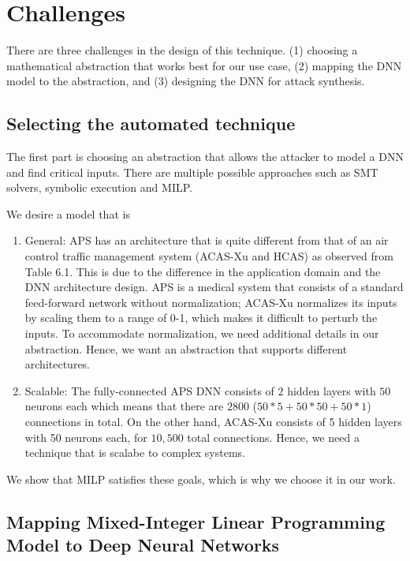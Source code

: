 \section{Challenges}
There are three challenges in the design of this technique. 
(1) choosing a mathematical abstraction that works best for our use case, 
(2) mapping the \ac{DNN}  model to the abstraction, and 
(3) designing the \ac{DNN}  for attack synthesis.  


\subsection{Selecting  the automated technique}
The first part is choosing an abstraction that allows the attacker to model a DNN and find critical inputs. 
There are multiple possible approaches such as \ac*{SMT} solvers, symbolic execution and \ac*{MILP}.

We desire a model that is
\begin{enumerate}
	\item General: \ac{APS} has an architecture that %
	is quite different from that of an air control traffic management system (\ac{ACAS-Xu} and \ac{HCAS}) as observed from Table 6.1.
	This is due to the difference in the application domain and the \ac{DNN} architecture design. 
	\ac{APS} is a medical system that consists of a standard feed-forward network without normalization; \ac{ACAS-Xu} normalizes its inputs by scaling them to a range of {0-1}, which makes it difficult to perturb the inputs. 
	To accommodate normalization, we need additional details in our abstraction.  
	Hence, we want an abstraction that supports different architectures. 
	\item Scalable: The fully-connected \ac{APS} \ac{DNN} consists of $2$ hidden layers with $50$ neurons each which means that there are $2800$ ($50*5 + 50*50 + 50*1$) connections in total.
	On the other hand, \ac{ACAS-Xu} consists of 5 hidden layers with 50 neurons each, for $10,500$ total connections. 
	Hence, we need a technique that is scalabe to complex systems. 
	
\end{enumerate}

 We show that \ac{MILP} satisfies these goals, which is why we choose it in our work. %


\subsection{ Mapping  Mixed-Integer Linear Programming Model to Deep Neural Networks}

